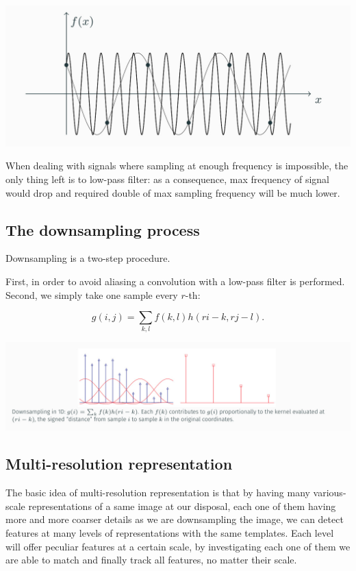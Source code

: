 \documentclass[10pt]{report}
\begin{document}
\begin{center}
\includegraphics[width=.9\linewidth]{./pics/proc/aliasing.jpg}
\end{center}

When dealing with signals where sampling at enough frequency is
impossible, the only thing left is to low-pass filter: as a consequence,
max frequency of signal would drop and required double of max sampling
frequency will be much lower.

\subsection{The downsampling process}
\label{the-downsampling-process}
Downsampling is a two-step procedure.

First, in order to avoid aliasing a convolution with a low-pass filter
is performed. Second, we simply take one sample every \(r\)-th:

\[g(i, j) = \sum_{k, l} f(k, l)h(ri - k, rj - l).\]

\begin{center}
\includegraphics[width=.9\linewidth]{./pics/proc/downsampling.jpg}
\end{center}

\subsection{Multi-resolution representation}
\label{multi-resolution-representation}
The basic idea of multi-resolution representation is that by having many
various-scale representations of a same image at our disposal, each one
of them having more and more coarser details as we are downsampling the
image, we can detect features at many levels of representations with the
same templates. Each level will offer peculiar features at a certain
scale, by investigating each one of them we are able to match and
finally track all features, no matter their scale.
\end{document}

